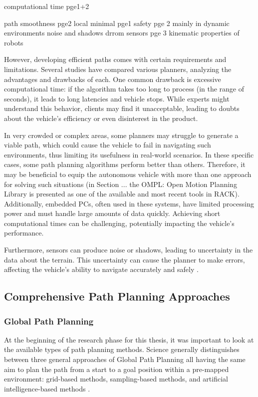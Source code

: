  


computational time pge1+2

path smoothness pge2
local minimal pge1
safety pge 2 mainly in dynamic environments 
noise and shadows drrom sensors pge 3
kinematic properties of robots 



However, developing efficient paths comes with certain requirements and limitations. Several studies have compared 
various planners, analyzing the advantages and drawbacks of each. One common drawback is excessive 
computational time: if the algorithm takes too long to process (in the range of seconds), it 
leads to long latencies and vehicle stops. While experts might understand this behavior, clients 
may find it unacceptable, leading to doubts about the vehicle's efficiency or even disinterest in the product.

In very crowded or complex areas, some planners may struggle to generate a viable path, which 
could cause the vehicle to fail in navigating such environments, thus limiting its usefulness 
in real-world scenarios. In these specific cases, some path planning algorithms perform better 
than others. Therefore, it may be beneficial to equip the autonomous vehicle with more than one 
approach for solving such situations (in Section ... the OMPL: Open Motion Planning Library is 
presented as one of the available and most recent tools in RACK). Additionally, embedded PCs, 
often used in these systems, have limited processing power and must handle large amounts of data 
quickly. Achieving short computational times can be challenging, potentially impacting the vehicle's performance.

Furthermore, sensors can produce noise or shadows, leading to uncertainty in the data about the 
terrain. This uncertainty can cause the planner to make errors, affecting the vehicle’s ability 
to navigate accurately and safely \cite{R12}.

\subsection{Comprehensive Path Planning Approaches}
\subsubsection{Global Path Planning}

At the beginning of the research phase for this thesis, it was important to look at the available types 
of path planning methods. Science generally distinguishes between three general approaches of Global 
Path Planning all having the same aim to plan the path from a start to a goal position within a pre-mapped 
environment:  grid-based methods, sampling-based methods, and artificial intelligence-based methods \cite{R13}. 

